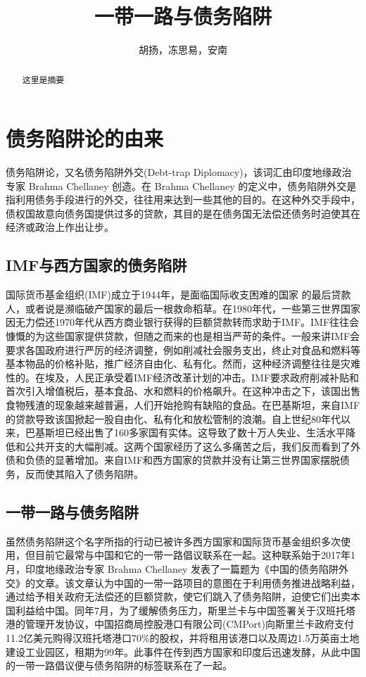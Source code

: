 \documentclass[a4paper,UTF8]{article}
\title{一带一路与债务陷阱}
\author{胡扬，冻思易，安南}
\begin{document}
	\maketitle
	\begin{abstract}
		这里是摘要
	\end{abstract}
	\section{债务陷阱论的由来}
		债务陷阱论，又名债务陷阱外交(Debt-trap Diplomacy)，该词汇由印度地缘政治专家 Brahma Chellaney 创造。在 Brahma Chellaney 的定义中，债务陷阱外交是指利用债务手段进行的外交，往往用来达到一些其他的目的。在这种外交手段中，债权国故意向债务国提供过多的贷款，其目的是在债务国无法偿还债务时迫使其在经济或政治上作出让步。
		\subsection{IMF与西方国家的债务陷阱}
			国际货币基金组织(IMF)成立于1944年，是面临国际收支困难的国家 的最后贷款人，或者说是濒临破产国家的最后一根救命稻草。在1980年代，一些第三世界国家因无力偿还1970年代从西方商业银行获得的巨额贷款转而求助于IMF。IMF往往会慷慨的为这些国家提供贷款，但随之而来的也是相当严苛的条件。一般来讲IMF会要求各国政府进行严厉的经济调整，例如削减社会服务支出，终止对食品和燃料等基本物品的价格补贴，推广经济自由化、私有化。然而，这种经济调整往往是灾难性的。在埃及，人民正承受着IMF经济改革计划的冲击。IMF要求政府削减补贴和首次引入增值税后，基本食品、水和燃料的价格飙升。在这种冲击之下，该国出售食物残渣的现象越来越普遍，人们开始抢购有缺陷的食品。在巴基斯坦，来自IMF的贷款导致该国掀起一股自由化、私有化和放松管制的浪潮。自上世纪80年代以来，巴基斯坦已经出售了160多家国有实体。这导致了数十万人失业、生活水平降低和公共开支的大幅削减。这两个国家经历了这么多痛苦之后，我们反而看到了外债和负债的显著增加。来自IMF和西方国家的贷款并没有让第三世界国家摆脱债务，反而使其陷入了债务陷阱。
		\subsection{一带一路与债务陷阱}
			虽然债务陷阱这个名字所指的行动已被许多西方国家和国际货币基金组织多次使用，但目前它最常与中国和它的一带一路倡议联系在一起。这种联系始于2017年1月，印度地缘政治专家 Brahma Chellaney 发表了一篇题为《中国的债务陷阱外交》的文章。该文章认为中国的一带一路项目的意图在于利用债务推进战略利益，通过给予相关政府无法偿还的巨额贷款，使它们跳入了债务陷阱，迫使它们出卖本国利益给中国。同年7月，为了缓解债务压力，斯里兰卡与中国签署关于汉班托塔港的管理开发协议，中国招商局控股港口有限公司(CMPort)向斯里兰卡政府支付11.2亿美元购得汉班托塔港口70\%的股权，并将租用该港口以及周边1.5万英亩土地建设工业园区，租期为99年。此事件在传到西方国家和印度后迅速发酵，从此中国的一带一路倡议便与债务陷阱的标签联系在了一起。
\end{document}
